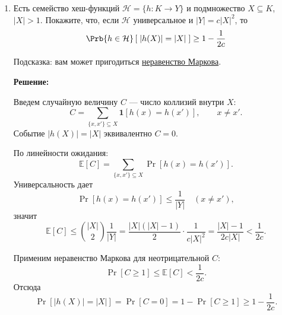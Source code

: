 \begin{enumerate}
\begin{enumerate}
    При чётном $n$ число $n - 1$ нечётно, поэтому $\dfrac{n-1}{2} \notin \mathbb{Z}$.

    Значит, равномерной хеш-функции в общем случае при четном $n$ может не быть.

 \end{enumerate}

  \item
    Есть семейство хеш-функций $\mathcal{H} = \{ h : K \rightarrow Y \}$ и подмножество
    $X \subseteq K$, $|X| > 1$. Покажите, что, если $\mathcal{H}$ универсальное
    и $|Y| = c |X|^2$, то
    $$\Prb{h \in \mathcal{H}}\left[ \; |h(X)| = |X| \; \right] \ge 1 - \frac{1}{2 c}$$

    Подсказка: вам может пригодиться \href{https://ru.wikipedia.org/wiki/%D0%9D%D0%B5%D1%80%D0%B0%D0%B2%D0%B5%D0%BD%D1%81%D1%82%D0%B2%D0%BE_%D0%9C%D0%B0%D1%80%D0%BA%D0%BE%D0%B2%D0%B0}{неравенство Маркова}.

    \textbf{Решение:}

    Введем случайную величину $C$ --- число коллизий внутри $X$:
    $$C=\sum_{\{x,x'\}\subseteq X}\mathbf 1[h(x)=h(x')],\qquad x\ne x'.$$
    Событие $|h(X)|=|X|$ эквивалентно $C=0$.

    По линейности ожидания:
    $$\mathbb{E}[C] = \sum_{\{x,x'\}\subseteq X}\Pr[h(x)=h(x')].$$
    Универсальность дает
    $$\Pr[h(x)=h(x')]\le \frac{1}{|Y|}\quad (x\ne x'),$$
    значит
    $$\mathbb{E}[C] \le \binom{|X|}{2}\frac{1}{|Y|}
    = \frac{|X|(|X|-1)}{2}\cdot\frac{1}{c|X|^2}
    = \frac{|X|-1}{2c|X|}
    < \frac{1}{2c}.$$

    Применим неравенство Маркова для неотрицательной $C$:
    $$\Pr[C\ge 1]\le \mathbb{E}[C] < \frac{1}{2c}.$$
    Отсюда
    $$\Pr[|h(X)|=|X|]=\Pr[C=0]=1-\Pr[C\ge 1]\ge 1-\frac{1}{2c}.$$

\end{enumerate}
